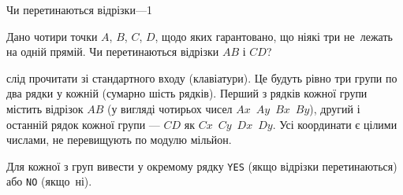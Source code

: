 ﻿\begin{problemAllDefault}{Чи перетинаються відрізки---1}

Дано чотири точки $A$, $B$, $C$, $D$, щодо яких гарантовано, що ніякі три не~лежать на одній прямій. Чи перетинаються відрізки $AB$ і $CD$?

\InputFile слід прочитати зі стандартного входу (клавіатури). Це будуть рівно три групи по два рядки у кожній (сумарно шість рядків). Перший з рядків кожної групи містить відрізок $AB$ (у вигляді чотирьох чисел $Ax$~$Ay$~$Bx$~$By$), другий і останній рядок кожної групи --- $CD$ як $Cx$~$Cy$~$Dx$~$Dy$. Усі координати є цілими числами, не перевищують по модулю мільйон.

\OutputFile Для кожної з груп вивести у окремому рядку \texttt{YES} (якщо відрізки перетинаються) або \texttt{NO} (якщо~ні).

\Example

\begin{example}
\end{example}

\end{problemAllDefault}
